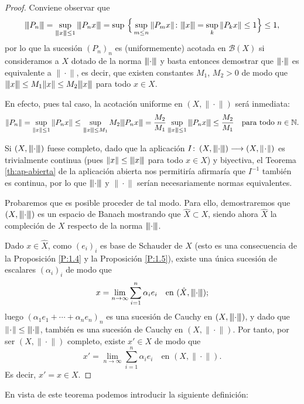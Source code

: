 	\begin{proof}
		Conviene observar que
		\[\vertiii{P_n}=\sup_{\vertiii{x} \leq 1}{\vertiii{P_nx}}=\sup\,\Big\{\sup_{m \leq n}\|P_mx\| \colon \vertiii{x} = \sup_{k}\| P_kx\| \leq 1\Big\} \leq 1,\]
		por lo que la sucesión $(P_n)_n$ es (uniformemente) acotada en $\mathcal{B}(X)$ si consideramos a $X$ dotado de la norma $\vertiii{\cdot}$ y basta entonces demostrar que $\vertiii{\cdot}$ es equivalente a $\|\!\cdot\!\|$, es decir, que existen constantes $M_1$, $M_2>0$ de modo que $\vertiii{x}\leq M_1\|x\|\leq M_2\vertiii{x}$ para todo $x\in X$.
		
		En efecto, pues tal caso, la acotación uniforme en $(X,\|\!\cdot\!\|)$ será inmediata:
		\[\|P_n\|=\sup_{\|x\|\leq 1}\|P_n x\|\leq\sup_{\vertiii{x}\leq M_1}M_2\vertiii{P_nx}=\dfrac{M_2}{M_1}\sup_{\vertiii{x}\leq 1}\vertiii{P_nx}\leq\dfrac{M_2}{M_1}\quad\text{para todo $n\in\mathbb{N}$}.\]
		
		
		Si $\left(X,\vertiii{\cdot}\right)$ fuese completo, dado que la aplicación $I \colon \left(X, \vertiii{\cdot}\right)\longrightarrow (X, \|\!\cdot\!\|)$ es trivialmente continua (pues $\|x\|\leq\vertiii{x}$ para todo $x\in X$) y biyectiva, el { Teorema \ref{th:ap-abierta} de la aplicación abierta} nos permitiría afirmaría que $I^{-1}$ también es continua, por lo que $\vertiii{\cdot}$ y $\|\!\cdot\!\|$ serían necesariamente normas equivalentes.
		
		Probaremos que es posible proceder de tal modo. Para ello, demostraremos que $\left(X,\vertiii{\cdot}\right)$ es un espacio de Banach mostrando que $\hat{X}\subset X$, siendo ahora $\hat{X}$ la compleción de $X$ respecto de la norma $\vertiii{\cdot}$.
		
		Dado $x\in\hat{X}$, como $(e_i)_i$ es base de Schauder de $\hat{X}$ (esto es una consecuencia de la Proposición \ref{P:1.4} y la Proposición \ref{P:1.5}), existe una única sucesión de escalares $(\alpha_i)_i$ de modo que
		\[x=\lim_{n\to\infty}\sum_{i=1}^n \alpha_i e_i\quad\text{en $(\hat{X},\vertiii{\cdot})$;}\]
		luego $(\alpha_1e_1+\cdots+\alpha_n e_n)_n$ es una sucesión de Cauchy en $(X,\vertiii{\cdot})$, y dado que $\|\!\cdot\!\|\leq\vertiii{\cdot}$, también es una sucesión de Cauchy en $(X,\|\!\cdot\!\|)$. Por tanto, por ser $(X,\|\!\cdot\!\|)$ completo, existe $x'\in X$ de modo que
		\[x'=\lim_{n\to\infty}\sum_{i=1}^n \alpha_i e_i\quad\text{en $(X,\|\!\cdot\!\|)$.}\]
		Es decir, $x'=x\in X$.
	\end{proof}
	
	En vista de este teorema podemos introducir la siguiente definición:
	
